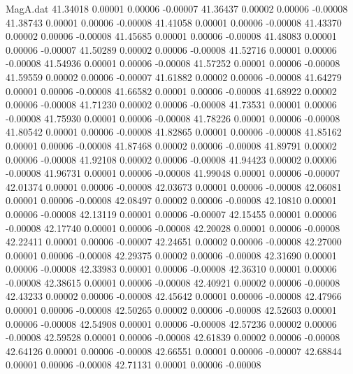 \begin{filecontents}{MagA.dat}
  41.34018    0.00001    0.00006   -0.00007
  41.36437    0.00002    0.00006   -0.00008
  41.38743    0.00001    0.00006   -0.00008
  41.41058    0.00001    0.00006   -0.00008
  41.43370    0.00002    0.00006   -0.00008
  41.45685    0.00001    0.00006   -0.00008
  41.48083    0.00001    0.00006   -0.00007
  41.50289    0.00002    0.00006   -0.00008
  41.52716    0.00001    0.00006   -0.00008
  41.54936    0.00001    0.00006   -0.00008
  41.57252    0.00001    0.00006   -0.00008
  41.59559    0.00002    0.00006   -0.00007
  41.61882    0.00002    0.00006   -0.00008
  41.64279    0.00001    0.00006   -0.00008
  41.66582    0.00001    0.00006   -0.00008
  41.68922    0.00002    0.00006   -0.00008
  41.71230    0.00002    0.00006   -0.00008
  41.73531    0.00001    0.00006   -0.00008
  41.75930    0.00001    0.00006   -0.00008
  41.78226    0.00001    0.00006   -0.00008
  41.80542    0.00001    0.00006   -0.00008
  41.82865    0.00001    0.00006   -0.00008
  41.85162    0.00001    0.00006   -0.00008
  41.87468    0.00002    0.00006   -0.00008
  41.89791    0.00002    0.00006   -0.00008
  41.92108    0.00002    0.00006   -0.00008
  41.94423    0.00002    0.00006   -0.00008
  41.96731    0.00001    0.00006   -0.00008
  41.99048    0.00001    0.00006   -0.00007
  42.01374    0.00001    0.00006   -0.00008
  42.03673    0.00001    0.00006   -0.00008
  42.06081    0.00001    0.00006   -0.00008
  42.08497    0.00002    0.00006   -0.00008
  42.10810    0.00001    0.00006   -0.00008
  42.13119    0.00001    0.00006   -0.00007
  42.15455    0.00001    0.00006   -0.00008
  42.17740    0.00001    0.00006   -0.00008
  42.20028    0.00001    0.00006   -0.00008
  42.22411    0.00001    0.00006   -0.00007
  42.24651    0.00002    0.00006   -0.00008
  42.27000    0.00001    0.00006   -0.00008
  42.29375    0.00002    0.00006   -0.00008
  42.31690    0.00001    0.00006   -0.00008
  42.33983    0.00001    0.00006   -0.00008
  42.36310    0.00001    0.00006   -0.00008
  42.38615    0.00001    0.00006   -0.00008
  42.40921    0.00002    0.00006   -0.00008
  42.43233    0.00002    0.00006   -0.00008
  42.45642    0.00001    0.00006   -0.00008
  42.47966    0.00001    0.00006   -0.00008
  42.50265    0.00002    0.00006   -0.00008
  42.52603    0.00001    0.00006   -0.00008
  42.54908    0.00001    0.00006   -0.00008
  42.57236    0.00002    0.00006   -0.00008
  42.59528    0.00001    0.00006   -0.00008
  42.61839    0.00002    0.00006   -0.00008
  42.64126    0.00001    0.00006   -0.00008
  42.66551    0.00001    0.00006   -0.00007
  42.68844    0.00001    0.00006   -0.00008
  42.71131    0.00001    0.00006   -0.00008

\end{filecontents}
